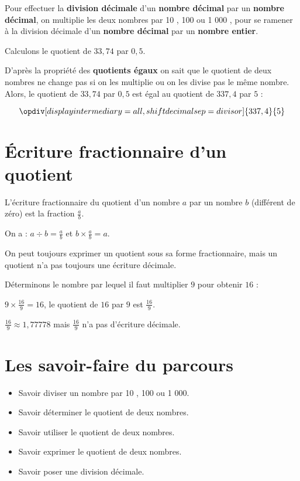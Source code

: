 \documentclass[a4paper,dvipsnames]{article}
\begin{document}
\begin{Mt}
Pour effectuer la \textbf{division décimale} d'un \textbf{nombre décimal} par un \textbf{nombre décimal}, on multiplie les deux nombres par 10 , 100 ou 1 000 , pour se ramener à la division décimale d'un \textbf{nombre décimal} par un \textbf{nombre entier}.

\begin{Ex}
Calculons le quotient de $33,74$ par $0,5$.

D'après la propriété des \textbf{quotients égaux} on sait que le quotient de deux nombres ne change pas si on les multiplie ou on les divise pas le même nombre. Alors, le quotient de $33,74$ par $0,5$ est égal au quotient de $337,4$ par $5$ :

\[\opdiv[displayintermediary=all,shiftdecimalsep=divisor]{337,4}{5}\]
\end{Ex}
\end{Mt}

\section{Écriture fractionnaire d'un quotient}

\begin{Def}
L'écriture fractionnaire du quotient d'un nombre $a$ par un nombre $b$ (différent de zéro) est la fraction $\frac{a}{b}$.

On a : $a\div b=\frac{a}{b}$ et $b\times\frac{a}{b}=a$.
\end{Def}

\begin{Rq}
On peut toujours exprimer un quotient sous sa forme fractionnaire, mais un quotient n'a pas toujours une écriture décimale.
\end{Rq}

\begin{Ex}
Déterminons le nombre par lequel il faut multiplier $9$ pour obtenir $16$ :

$9\times\frac{16}{9}=16$, le quotient de $16$ par $9$ est $\frac{16}{9}$.

$\frac{16}{9}\approx1,77778$ mais $\frac{16}{9}$ n'a pas d'écriture décimale.
\end{Ex}

\section{Les savoir-faire du parcours}

\begin{CpsCol}
\begin{itemize}
\item Savoir diviser un nombre par 10 , 100 ou 1 000.
\item Savoir déterminer le quotient de deux nombres.
\item Savoir utiliser le quotient de deux nombres.
\item Savoir exprimer le quotient de deux nombres.
\item Savoir poser une division décimale.
\end{itemize}
\end{CpsCol}
\end{document}

